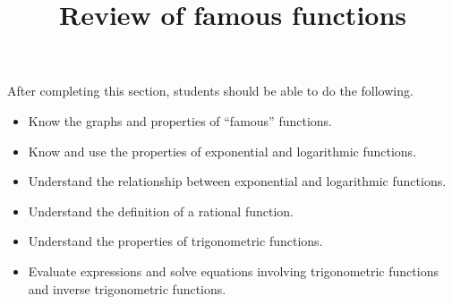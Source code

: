 \documentclass{ximera}
\title{Review of famous functions}
\begin{document}
\begin{abstract} 
\end{abstract}

\maketitle

\begin{sectionOutcomes}
After completing this section, students should be able to do the following.

\begin{itemize}
	\item Know the graphs and properties of ``famous'' functions.
	\item Know and use the properties of exponential and logarithmic functions.
	\item Understand the relationship between exponential and logarithmic functions.
        \item Understand the definition of a rational function.
	\item Understand the properties of trigonometric functions.
	\item Evaluate expressions and solve equations involving
          trigonometric functions and inverse trigonometric functions.
\end{itemize}
\end{sectionOutcomes}
\end{document}
